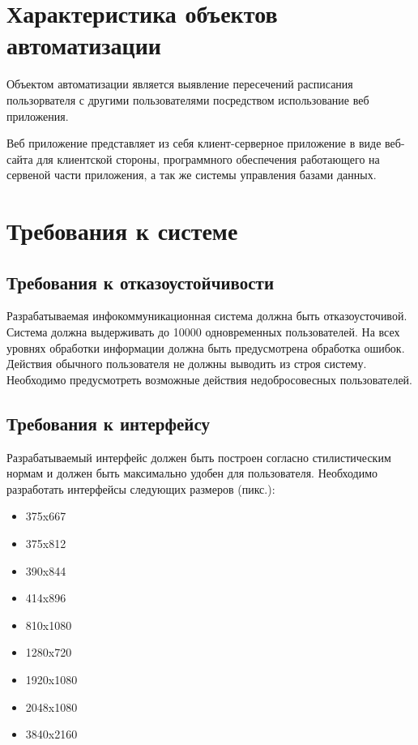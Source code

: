 \documentclass[14pt]{extreport}
\begin{document}
\chapter{Характеристика объектов автоматизации}
        Объектом автоматизации является выявление пересечений расписания пользорвателя с другими пользователями посредством использование веб приложения.
        
        Веб приложение представляет из себя клиент-серверное приложение в виде веб-сайта для клиентской стороны, программного обеспечения работающего на сервеной части приложения, а так же системы управления базами данных.

\chapter{Требования к системе}

        \section{Требования к отказоустойчивости}
            Разрабатываемая инфокоммуникационная система должна быть отказоусточивой. Система должна выдерживать до 10000 одновременных пользователей. На всех уровнях обработки информации должна быть предусмотрена обработка ошибок. Действия обычного пользователя не должны выводить из строя систему. Необходимо предусмотреть возможные действия недобросовесных пользователей. 

        \section{Требования к интерфейсу}
            Разрабатываемый интерфейс должен быть построен согласно стилистическим нормам и должен быть максимально удобен для пользователя. Необходимо разработать интерфейсы следующих размеров (пикс.):
            \begin{itemize}
                \item 375x667
                \item 375x812 
                \item 390x844
                \item 414x896
                \item 810x1080
                \item 1280x720
                \item 1920x1080
                \item 2048x1080
                \item 3840x2160
            \end{itemize}
\end{document}
